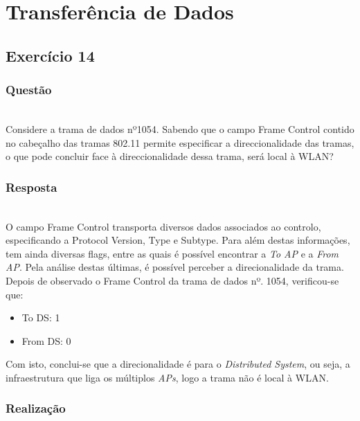 \documentclass{llncs}
\begin{document}
\clearpage

\section{Transferência de Dados}
\subsection{Exercício 14}
\subsubsection{Questão}\rule[-10pt]{0pt}{10pt}\\

Considere a trama de dados nº1054. Sabendo que o campo Frame Control contido no cabeçalho das tramas 802.11 permite especificar a direccionalidade das tramas, o que pode concluir face à direccionalidade dessa trama, será local à WLAN?

\subsubsection{Resposta}\rule[-10pt]{0pt}{10pt}\\

O campo Frame Control transporta diversos dados associados ao controlo, especificando a Protocol Version, Type e Subtype. Para além destas informações, tem ainda diversas flags, entre as quais é possível encontrar a \textit{To AP} e a \textit{From AP}.
Pela análise destas últimas, é possível perceber a direcionalidade da trama. Depois de observado o Frame Control da trama de dados nº. 1054, verificou-se que:

\begin{itemize}
  \item To DS: 1

  \item From DS: 0
\end{itemize}

Com isto, conclui-se que a direcionalidade é para o \textit{Distributed System}, ou seja, a infraestrutura que liga os múltiplos \textit{APs}, logo a trama não é local à WLAN.

\subsubsection{Realização}\rule[-10pt]{0pt}{10pt}\\
\end{document}
